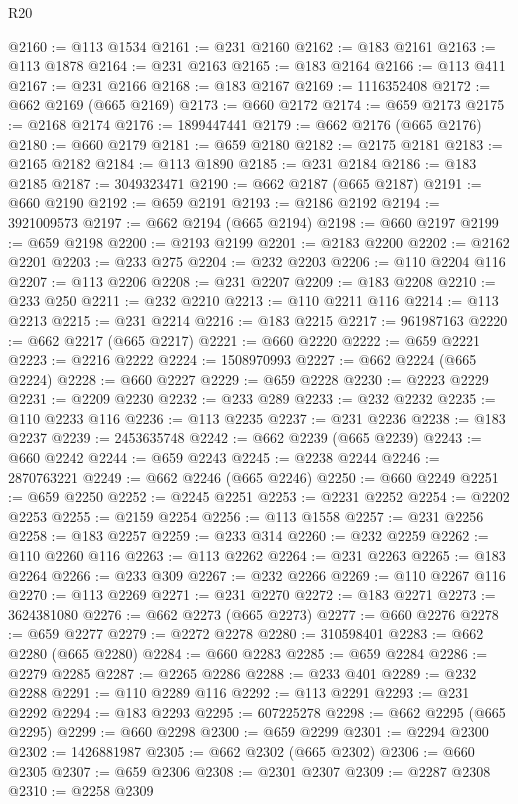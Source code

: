 \begin{lexlean}{R20}
\begin{coremodule}
@2160 := @113 @1534
@2161 := @231 @2160
@2162 := @183 @2161
@2163 := @113 @1878
@2164 := @231 @2163
@2165 := @183 @2164
@2166 := @113 @411
@2167 := @231 @2166
@2168 := @183 @2167
@2169 := 1116352408
@2172 := @662 @2169 (@665 @2169)
@2173 := @660 @2172
@2174 := @659 @2173
@2175 := @2168 @2174
@2176 := 1899447441
@2179 := @662 @2176 (@665 @2176)
@2180 := @660 @2179
@2181 := @659 @2180
@2182 := @2175 @2181
@2183 := @2165 @2182
@2184 := @113 @1890
@2185 := @231 @2184
@2186 := @183 @2185
@2187 := 3049323471
@2190 := @662 @2187 (@665 @2187)
@2191 := @660 @2190
@2192 := @659 @2191
@2193 := @2186 @2192
@2194 := 3921009573
@2197 := @662 @2194 (@665 @2194)
@2198 := @660 @2197
@2199 := @659 @2198
@2200 := @2193 @2199
@2201 := @2183 @2200
@2202 := @2162 @2201
@2203 := @233 @275
@2204 := @232 @2203
@2206 := @110 @2204 @116
@2207 := @113 @2206
@2208 := @231 @2207
@2209 := @183 @2208
@2210 := @233 @250
@2211 := @232 @2210
@2213 := @110 @2211 @116
@2214 := @113 @2213
@2215 := @231 @2214
@2216 := @183 @2215
@2217 := 961987163
@2220 := @662 @2217 (@665 @2217)
@2221 := @660 @2220
@2222 := @659 @2221
@2223 := @2216 @2222
@2224 := 1508970993
@2227 := @662 @2224 (@665 @2224)
@2228 := @660 @2227
@2229 := @659 @2228
@2230 := @2223 @2229
@2231 := @2209 @2230
@2232 := @233 @289
@2233 := @232 @2232
@2235 := @110 @2233 @116
@2236 := @113 @2235
@2237 := @231 @2236
@2238 := @183 @2237
@2239 := 2453635748
@2242 := @662 @2239 (@665 @2239)
@2243 := @660 @2242
@2244 := @659 @2243
@2245 := @2238 @2244
@2246 := 2870763221
@2249 := @662 @2246 (@665 @2246)
@2250 := @660 @2249
@2251 := @659 @2250
@2252 := @2245 @2251
@2253 := @2231 @2252
@2254 := @2202 @2253
@2255 := @2159 @2254
@2256 := @113 @1558
@2257 := @231 @2256
@2258 := @183 @2257
@2259 := @233 @314
@2260 := @232 @2259
@2262 := @110 @2260 @116
@2263 := @113 @2262
@2264 := @231 @2263
@2265 := @183 @2264
@2266 := @233 @309
@2267 := @232 @2266
@2269 := @110 @2267 @116
@2270 := @113 @2269
@2271 := @231 @2270
@2272 := @183 @2271
@2273 := 3624381080
@2276 := @662 @2273 (@665 @2273)
@2277 := @660 @2276
@2278 := @659 @2277
@2279 := @2272 @2278
@2280 := 310598401
@2283 := @662 @2280 (@665 @2280)
@2284 := @660 @2283
@2285 := @659 @2284
@2286 := @2279 @2285
@2287 := @2265 @2286
@2288 := @233 @401
@2289 := @232 @2288
@2291 := @110 @2289 @116
@2292 := @113 @2291
@2293 := @231 @2292
@2294 := @183 @2293
@2295 := 607225278
@2298 := @662 @2295 (@665 @2295)
@2299 := @660 @2298
@2300 := @659 @2299
@2301 := @2294 @2300
@2302 := 1426881987
@2305 := @662 @2302 (@665 @2302)
@2306 := @660 @2305
@2307 := @659 @2306
@2308 := @2301 @2307
@2309 := @2287 @2308
@2310 := @2258 @2309

\end{coremodule}
\end{lexlean}
